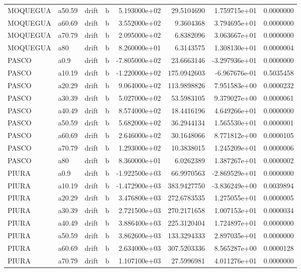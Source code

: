 \documentclass[
]{article}
\begin{document}
\begin{table}[!h]
\begin{tabular}[t]{llllrrrr}
MOQUEGUA & a50.59 & drift & b & 5.193000e+02 & 29.5104690 & 1.759715e+01 & 0.0000000\\
MOQUEGUA & a60.69 & drift & b & 3.552000e+02 & 9.3604368 & 3.794695e+01 & 0.0000000\\
MOQUEGUA & a70.79 & drift & b & 2.095000e+02 & 6.8382096 & 3.063667e+01 & 0.0000000\\
\addlinespace
MOQUEGUA & a80 & drift & b & 8.260000e+01 & 6.3143575 & 1.308130e+01 & 0.0000004\\
PASCO & a0.9 & drift & b & -7.805000e+02 & 23.6663146 & -3.297936e+01 & 0.0000000\\
PASCO & a10.19 & drift & b & -1.220000e+02 & 175.0942603 & -6.967676e-01 & 0.5035458\\
PASCO & a20.29 & drift & b & 9.064000e+02 & 113.9898826 & 7.951583e+00 & 0.0000232\\
PASCO & a30.39 & drift & b & 5.027000e+02 & 53.5983105 & 9.379027e+00 & 0.0000061\\
\addlinespace
PASCO & a40.49 & drift & b & 8.574000e+02 & 18.4416196 & 4.649266e+01 & 0.0000000\\
PASCO & a50.59 & drift & b & 5.682000e+02 & 36.2944134 & 1.565530e+01 & 0.0000001\\
PASCO & a60.69 & drift & b & 2.646000e+02 & 30.1648066 & 8.771812e+00 & 0.0000105\\
PASCO & a70.79 & drift & b & 1.293000e+02 & 10.3838015 & 1.245209e+01 & 0.0000006\\
PASCO & a80 & drift & b & 8.360000e+01 & 6.0262389 & 1.387267e+01 & 0.0000002\\
\addlinespace
PIURA & a0.9 & drift & b & -1.922500e+03 & 66.9970563 & -2.869529e+01 & 0.0000000\\
PIURA & a10.19 & drift & b & -1.472900e+03 & 383.9427750 & -3.836249e+00 & 0.0039894\\
PIURA & a20.29 & drift & b & 3.476800e+03 & 272.6783535 & 1.275055e+01 & 0.0000005\\
PIURA & a30.39 & drift & b & 2.721500e+03 & 270.2171658 & 1.007153e+01 & 0.0000034\\
PIURA & a40.49 & drift & b & 3.886400e+03 & 225.3120404 & 1.724897e+01 & 0.0000000\\
\addlinespace
PIURA & a50.59 & drift & b & 3.862600e+03 & 133.3294333 & 2.897035e+01 & 0.0000000\\
PIURA & a60.69 & drift & b & 2.634000e+03 & 307.5203336 & 8.565287e+00 & 0.0000128\\
PIURA & a70.79 & drift & b & 1.107100e+03 & 27.5996981 & 4.011276e+01 & 0.0000000\\

\end{tabular}
\end{table}
\end{document}
